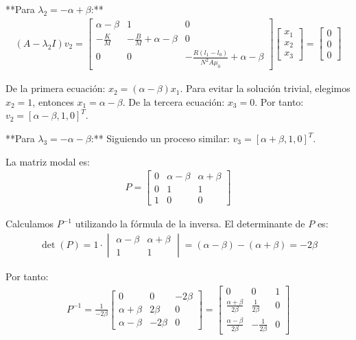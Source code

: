 \documentclass[
  11pt,
  letterpaper,
   addpoints,
   answers
  ]{exam}
\begin{document}
\begin{solution}
**Para $\lambda_2 = -\alpha + \beta$:**
\begin{align}
(A - \lambda_2 I)v_2 = \begin{bmatrix}
\alpha - \beta & 1 & 0 \\
-\frac{K}{M} & -\frac{B}{M} + \alpha - \beta & 0 \\
0 & 0 & -\frac{R(l_1 - l_0)}{N^2 A \mu_0} + \alpha - \beta
\end{bmatrix} \begin{bmatrix} x_1 \\ x_2 \\ x_3 \end{bmatrix} = \begin{bmatrix} 0 \\ 0 \\ 0 \end{bmatrix}
\end{align}

De la primera ecuación: $x_2 = (\alpha - \beta)x_1$.
Para evitar la solución trivial, elegimos $x_2 = 1$, entonces $x_1 = \alpha - \beta$.
De la tercera ecuación: $x_3 = 0$.
Por tanto: $v_2 = [\alpha - \beta, 1, 0]^T$.

**Para $\lambda_3 = -\alpha - \beta$:**
Siguiendo un proceso similar:
$v_3 = [\alpha + \beta, 1, 0]^T$.

La matriz modal es:
\begin{align}
P = \begin{bmatrix}
0 & \alpha - \beta & \alpha + \beta \\
0 & 1 & 1 \\
1 & 0 & 0
\end{bmatrix}
\end{align}

Calculamos $P^{-1}$ utilizando la fórmula de la inversa. El determinante de $P$ es:
\begin{align}
\det(P) = 1 \cdot \begin{vmatrix} \alpha - \beta & \alpha + \beta \\ 1 & 1 \end{vmatrix} = (\alpha - \beta) - (\alpha + \beta) = -2\beta
\end{align}

Por tanto:
\begin{align}
P^{-1} = \frac{1}{-2\beta} \begin{bmatrix}
0 & 0 & -2\beta \\
\alpha + \beta & 2\beta & 0 \\
\alpha - \beta & -2\beta & 0
\end{bmatrix} = \begin{bmatrix}
0 & 0 & 1 \\
\frac{\alpha + \beta}{2\beta} & \frac{1}{2\beta} & 0 \\
\frac{\alpha - \beta}{2\beta} & -\frac{1}{2\beta} & 0
\end{bmatrix}
\end{align}


\end{solution}
\end{document}
